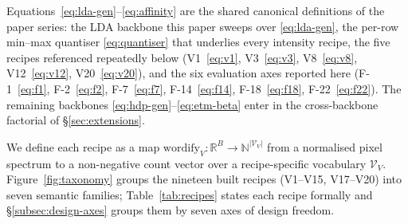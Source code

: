 \documentclass[journal,a4paper,10pt]{IEEEtran}
\begin{document}


Equations~\eqref{eq:lda-gen}--\eqref{eq:affinity} are the shared
canonical definitions of the paper series: the LDA backbone this
paper sweeps over \eqref{eq:lda-gen}, the per-row min--max quantiser
\eqref{eq:quantiser} that underlies every intensity recipe, the five
recipes referenced repeatedly below
(V1~\eqref{eq:v1}, V3~\eqref{eq:v3}, V8~\eqref{eq:v8},
V12~\eqref{eq:v12}, V20~\eqref{eq:v20}), and the six evaluation axes
reported here (F-1~\eqref{eq:f1}, F-2~\eqref{eq:f2}, F-7~\eqref{eq:f7},
F-14~\eqref{eq:f14}, F-18~\eqref{eq:f18}, F-22~\eqref{eq:f22}). The
remaining backbones \eqref{eq:hdp-gen}--\eqref{eq:etm-beta} enter in the
cross-backbone factorial of \S\ref{sec:extensions}.

We define each recipe as a map $\mathrm{wordify}_V : \mathbb{R}^B \to
\mathbb{N}^{|\mathcal{V}_V|}$ from a normalised pixel spectrum to a
non-negative count vector over a recipe-specific vocabulary
$\mathcal{V}_V$. Figure~\ref{fig:taxonomy} groups the nineteen built
recipes (V1--V15, V17--V20) into seven semantic families;
Table~\ref{tab:recipes} states each recipe formally and
\S\ref{subsec:design-axes} groups them by seven axes of design freedom.
\end{document}
